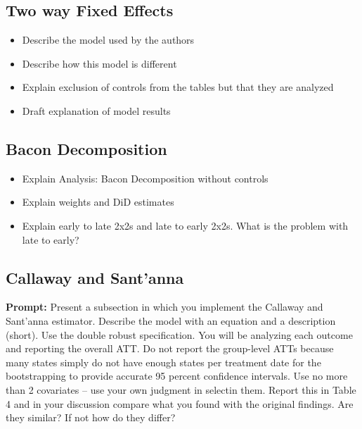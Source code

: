 \documentclass{article}
\begin{document}
\subsection{Two way Fixed Effects}

\begin{itemize}
\item 
Describe the model used by the authors
\item
Describe how this model is different
\item
Explain exclusion of controls from the tables but that they are analyzed
\item 
Draft explanation of model results
\end{itemize}







\subsection{Bacon Decomposition}

\begin{itemize}
\item
Explain Analysis: Bacon Decomposition without controls
\item
Explain weights and DiD estimates
\item
Explain early to late 2x2s and late to early 2x2s. What is the problem with late to early?
\end{itemize}

\begin{landscape}






\end{landscape}


\subsection{Callaway and Sant'anna}

\textbf{Prompt: } Present a subsection in which you implement the Callaway and Sant’anna estimator.  Describe the model with an equation and a description (short). Use the double robust specification. You will be analyzing each outcome and reporting the overall ATT.  Do not report the group-level ATTs because many states simply do not have enough states per treatment date for the bootstrapping to provide accurate 95 percent confidence intervals.  Use no more than 2 covariates – use your own judgment in selectin them. Report this in Table 4 and in your discussion compare what you found with the original findings.  Are they similar?  If not how do they differ?
\end{document}
